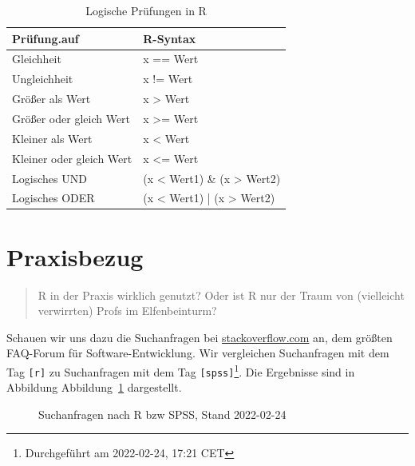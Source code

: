 \documentclass[
  a4paper,
  DIV=11]{scrreprt}
\theoremstyle{definition}
\theoremstyle{definition}
\theoremstyle{definition}
\theoremstyle{remark}
\begin{document}
\begin{longtable}{ll}

\caption{\label{tbl-lgl}Logische Prüfungen in R}

\tabularnewline

\toprule
Prüfung.auf & R-Syntax \\ 
\midrule\addlinespace[2.5pt]
Gleichheit & x == Wert \\ 
Ungleichheit & x != Wert \\ 
Größer als Wert & x > Wert \\ 
Größer oder gleich Wert & x >= Wert \\ 
Kleiner als Wert & x < Wert \\ 
Kleiner oder gleich Wert & x <= Wert \\ 
Logisches UND & (x < Wert1) \& (x > Wert2) \\ 
Logisches ODER & (x < Wert1) | (x > Wert2) \\ 
\bottomrule

\end{longtable}

\section{Praxisbezug}\label{praxisbezug-1}

\begin{quote}
{} R in der Praxis wirklich genutzt? Oder ist R nur der
Traum von (vielleicht verwirrten) Profs im Elfenbeinturm?
\end{quote}

Schauen wir uns dazu die Suchanfragen bei
\href{www.stackoverflow.com}{stackoverflow.com} an, dem größten
FAQ-Forum für Software-Entwicklung. Wir vergleichen Suchanfragen mit dem
Tag \texttt{{[}r{]}} zu Suchanfragen mit dem Tag
\texttt{{[}spss{]}}\footnote{Durchgeführt am 2022-02-24, 17:21 CET}. Die
Ergebnisse sind in Abbildung Abbildung~\ref{fig-stackoverflow1}
dargestellt.

\begin{figure}


\caption{\label{fig-stackoverflow1}Suchanfragen nach R bzw SPSS, Stand
2022-02-24}

\end{figure}%
\end{document}
